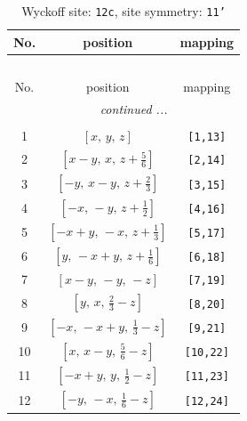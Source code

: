 \documentclass[fleqn,8pt]{jsarticle}
\begin{document}
\begin{longtable}{ccc}
\caption{Wyckoff site: {\tt 12c}, site symmetry: {\tt 11'}}
 \\
 \hline \hline
No. & position & mapping \\ \hline \endfirsthead

\multicolumn{2}{l}{\tablename\ \thetable{}} \\
 \hline \hline
No. & position & mapping \\ \hline \endhead

 \hline \hline
\multicolumn{2}{r}{\footnotesize\it continued ...} \\ \endfoot

 \hline \hline
\multicolumn{2}{r}{} \\ \endlastfoot

1 & $\left[ x,\, y,\, z \right]$ & {\tt [1,13]} \\ \hline
2 & $\left[ x - y,\, x,\, z + \frac{5}{6} \right]$ & {\tt [2,14]} \\ \hline
3 & $\left[ - y,\, x - y,\, z + \frac{2}{3} \right]$ & {\tt [3,15]} \\ \hline
4 & $\left[ - x,\, - y,\, z + \frac{1}{2} \right]$ & {\tt [4,16]} \\ \hline
5 & $\left[ - x + y,\, - x,\, z + \frac{1}{3} \right]$ & {\tt [5,17]} \\ \hline
6 & $\left[ y,\, - x + y,\, z + \frac{1}{6} \right]$ & {\tt [6,18]} \\ \hline
7 & $\left[ x - y,\, - y,\, - z \right]$ & {\tt [7,19]} \\ \hline
8 & $\left[ y,\, x,\, \frac{2}{3} - z \right]$ & {\tt [8,20]} \\ \hline
9 & $\left[ - x,\, - x + y,\, \frac{1}{3} - z \right]$ & {\tt [9,21]} \\ \hline
10 & $\left[ x,\, x - y,\, \frac{5}{6} - z \right]$ & {\tt [10,22]} \\ \hline
11 & $\left[ - x + y,\, y,\, \frac{1}{2} - z \right]$ & {\tt [11,23]} \\ \hline
12 & $\left[ - y,\, - x,\, \frac{1}{6} - z \right]$ & {\tt [12,24]} \\
\end{longtable}
\end{document}

